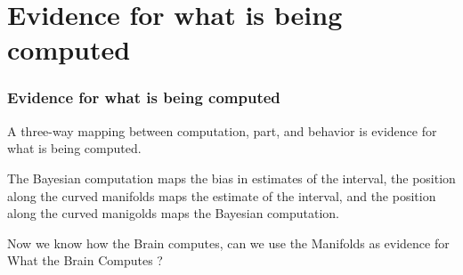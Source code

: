 \documentclass{beamer}
\begin{document}
\section{Evidence for what is being computed}
\begin{frame}
\frametitle{\textbf{Evidence for what is being computed} }
A three-way mapping between computation, part, and behavior is evidence for what is being computed.

The Bayesian computation maps the bias in estimates of the interval, the position along the curved manifolds maps the estimate of the interval, and the position along the curved manigolds maps the Bayesian computation.

Now we know how the Brain computes, can we use the Manifolds as evidence for What the Brain Computes ?


\end{frame}

\end{document}
